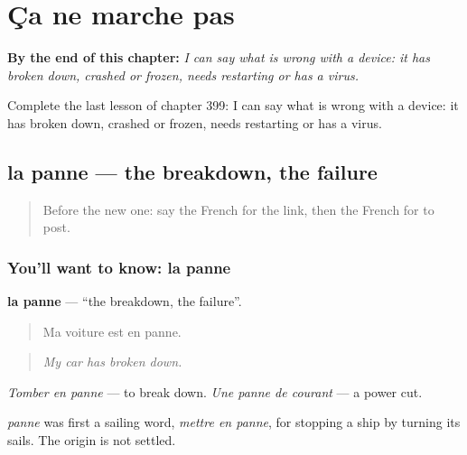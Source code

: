 
\chapter{Ça ne marche pas}
\label{ch:fr-ca-ne-marche-pas}

\begin{chapteropening}
\textbf{By the end of this chapter:} \emph{I can say what is wrong with a device: it has broken down, crashed or frozen, needs restarting or has a virus.}

Complete the last lesson of chapter 399: I can say what is wrong with a device: it has broken down, crashed or frozen, needs restarting or has a virus.
\end{chapteropening}

\section[la panne]{la panne — the breakdown, the failure}

\label{lesson:FR-C399-panne}



\begin{quote}
Before the new one: say the French for the link, then the French for to post.
\end{quote}

\subsection*{You'll want to know: la panne}
\textbf{la panne} — \textquotedblleft{}the breakdown, the failure\textquotedblright{}.

\begin{quote}
Ma voiture est en panne.
\end{quote}

\begin{quote}
\emph{My car has broken down.}
\end{quote}

\emph{Tomber en panne} — to break down. \emph{Une panne de courant} — a power cut.

\begin{cousinweb}
\emph{panne} was first a sailing word, \emph{mettre en panne}, for stopping a ship by turning its sails. The origin is not settled.
\end{cousinweb}

